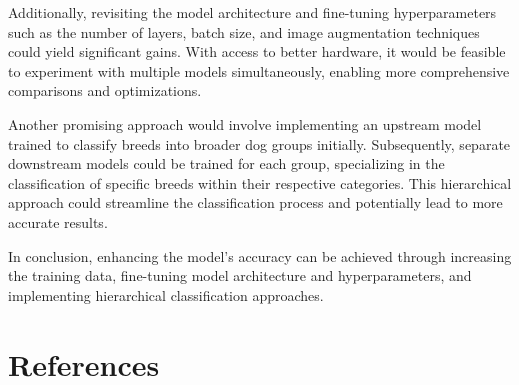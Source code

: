 \documentclass[11pt]{article}
\begin{document}
Additionally, revisiting the model architecture and fine-tuning hyperparameters such as the number of layers, batch size, and image augmentation techniques could yield significant gains. With access to better hardware, it would be feasible to experiment with multiple models simultaneously, enabling more comprehensive comparisons and optimizations.

Another promising approach would involve implementing an upstream model trained to classify breeds into broader dog groups initially. Subsequently, separate downstream models could be trained for each group, specializing in the classification of specific breeds within their respective categories. This hierarchical approach could streamline the classification process and potentially lead to more accurate results.

In conclusion, enhancing the model's accuracy can be achieved through increasing the training data, fine-tuning model architecture and hyperparameters, and implementing hierarchical classification approaches. 

\clearpage

\section{References} 
\printbibliography[heading=none]
% 
\end{document}
